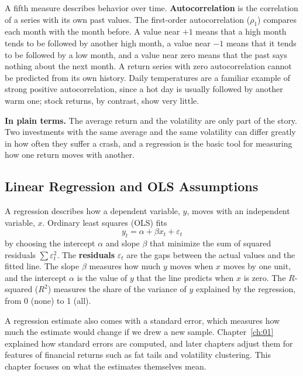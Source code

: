 A fifth measure describes behavior over time. \textbf{Autocorrelation} is the correlation of a series with its own past values. The first-order autocorrelation ($\rho_1$) compares each month with the month before. A value near $+1$ means that a high month tends to be followed by another high month, a value near $-1$ means that it tends to be followed by a low month, and a value near zero means that the past says nothing about the next month. A return series with zero autocorrelation cannot be predicted from its own history. Daily temperatures are a familiar example of strong positive autocorrelation, since a hot day is usually followed by another warm one; stock returns, by contrast, show very little.

\noindent\textbf{In plain terms.} The average return and the volatility are only part of the story. Two investments with the same average and the same volatility can differ greatly in how often they suffer a crash, and a regression is the basic tool for measuring how one return moves with another.

\subsection{Linear Regression and OLS Assumptions}
\label{sec:04-regression}
A regression describes how a dependent variable, $y$, moves with an independent variable, $x$. Ordinary least squares (OLS) fits
\begin{equation}
  y_t = \alpha + \beta x_t + \varepsilon_t
  \label{eq:04-ols}
\end{equation}
by choosing the intercept $\alpha$ and slope $\beta$ that minimize the sum of squared residuals $\sum \varepsilon_t^2$. The \textbf{residuals} $\varepsilon_t$ are the gaps between the actual values and the fitted line. The slope $\beta$ measures how much $y$ moves when $x$ moves by one unit, and the intercept $\alpha$ is the value of $y$ that the line predicts when $x$ is zero. The $R$-squared ($R^2$) measures the share of the variance of $y$ explained by the regression, from 0 (none) to 1 (all).

A regression estimate also comes with a standard error, which measures how much the estimate would change if we drew a new sample. Chapter~\ref{ch:01} explained how standard errors are computed, and later chapters adjust them for features of financial returns such as fat tails and volatility clustering. This chapter focuses on what the estimates themselves mean.

